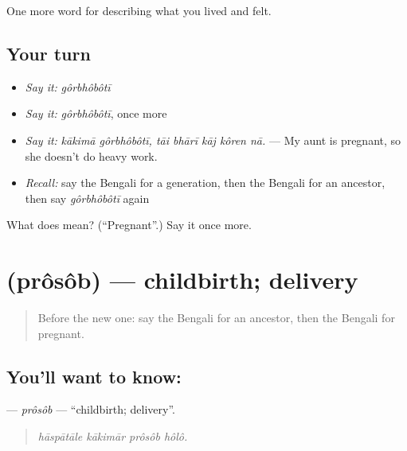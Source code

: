 \begin{grammarlens}[title={What you've built}]
One more word for describing what you lived and felt.
\end{grammarlens}

\subsection*{Your turn}
\begin{itemize}
\raggedright
  \item \emph{Say it:} \emph{gôrbhôbôtī}
  \item \emph{Say it:} \emph{gôrbhôbôtī}, once more
  \item \emph{Say it:} \emph{kākimā gôrbhôbôtī, tāi bhārī kāj kôren nā.} — My aunt is pregnant, so she doesn't do heavy work.
  \item \emph{Recall:} say the Bengali for a generation, then the Bengali for an ancestor, then say \emph{gôrbhôbôtī} again
\end{itemize}

\begin{tcolorbox}[breakable,colback=teal!4,colframe=teal!35!black,title={Before you move on}]
What does  mean? (\textquotedblleft{}Pregnant\textquotedblright{}.) Say it once more.
\end{tcolorbox}
\section[\texorpdfstring{\bn{প্রসব} (prôsôb)}{প্রসব (prôsôb)}]{ (prôsôb) — childbirth; delivery}

\label{lesson:BN-C485-prosob}



\begin{quote}
Before the new one: say the Bengali for an ancestor, then the Bengali for pregnant.
\end{quote}

\subsection*{You'll want to know: }
\textbf{} — \emph{prôsôb} — \textquotedblleft{}childbirth; delivery\textquotedblright{}.

\begin{quote}
   
\end{quote}

\begin{quote}
\emph{hāspātāle kākimār prôsôb hôlô.}
\end{quote}

